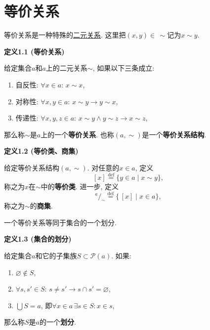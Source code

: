 


\setlength{\abovedisplayskip}{1pt}
\setlength{\belowdisplayskip}{1pt}

\section{等价关系}

等价关系是一种特殊的\href{02 二元关系#nameddest=sec:定义1.1}{二元关系}.
这里把$(x,y)\in\,\sim$记为$x\sim y$.

\vspace{10pt}

\hypertarget{sec:定义1.1}{}
\noindent\textbf{定义1.1 (等价关系)}

给定集合$a$和$a$上的二元关系$\sim$, 如果以下三条成立:
\begin{enumerate}
    \item 自反性: $\forall x\in a:\,x\sim x$,
    \item 对称性: $\forall x,y\in a:\,x\sim y\to y\sim x$,
    \item 传递性: $\forall x,y,z\in a:\,x\sim y\land y\sim z\to x\sim z$,
\end{enumerate}
那么称$\sim$是$a$上的一个\textbf{等价关系}.
也称$(a,\sim)$是一个\textbf{等价关系结构}.

\vspace{10pt}

\hypertarget{sec:定义1.2}{}
\noindent\textbf{定义1.2 (等价类、商集)}

给定等价关系结构$(a,\sim)$. 对任意的$x\in a$, 定义
\[
    [x]\overset{\mathrm{def}}{=}\{y\in a\mid x\sim y\},
\]
称之为$x$在$\sim$中的\textbf{等价类}. 进一步, 定义
\[
    ^{\displaystyle a}\!/_{\displaystyle\sim}\overset{\mathrm{def}}{=}
    \{\,[x]\mid x\in a\},
\]
称之为$\sim$的\textbf{商集}.

\vspace{10pt}

一个等价关系等同于集合的一个划分.

\vspace{10pt}

\hypertarget{sec:定义1.3}{}
\noindent\textbf{定义1.3 (集合的划分)}

给定集合$a$和它的子集族$S\subset\mathcal{P}(a)$. 如果:
\begin{enumerate}
    \item $\varnothing\notin S$,
    \item $\forall s,s'\in S:\,s\neq s'\to s\cap s'=\varnothing$,
    \item $\displaystyle\bigcup S=a$, 即$\forall x\in a\,\exists s\in S:x\in s$,
\end{enumerate}
那么称$S$是$a$的一个\textbf{划分}.

